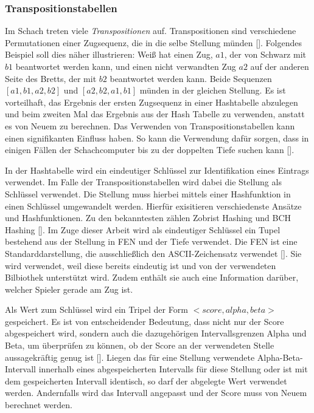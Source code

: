 \subsubsection{Transpositionstabellen} \label{ch:transposition-tables}

Im Schach treten viele \textit{Transpositionen} auf.
Transpositionen sind verschiedene Permutationen einer Zugsequenz, die in die selbe Stellung münden [\cite{Russell2010}].
Folgendes Beispiel soll dies näher illustrieren: Weiß hat einen Zug, $a1$, der von Schwarz mit $b1$ beantwortet werden kann, und einen nicht verwandten Zug $a2$ auf der anderen Seite des Bretts, der mit $b2$ beantwortet werden kann.
Beide Sequenzen $[a1, b1, a2, b2]$ und $[a2, b2, a1, b1]$ münden in der gleichen Stellung.
Es ist vorteilhaft, das Ergebnis der ersten Zugsequenz in einer Hashtabelle abzulegen und beim zweiten Mal das Ergebnis aus der Hash Tabelle zu verwenden, anstatt es von Neuem zu berechnen.
Das Verwenden von Transpositionstabellen kann einen signifikanten Einfluss haben.
So kann die Verwendung dafür sorgen, dass in einigen Fällen der Schachcomputer bis zu der doppelten Tiefe suchen kann [\cite{Russell2010}].

In der Hashtabelle wird ein eindeutiger Schlüssel zur Identifikation eines Eintrags verwendet.
Im Falle der Transpositionstabellen wird dabei die Stellung als Schlüssel verwendet.
Die Stellung muss hierbei mittels einer Hashfunktion in einen Schlüssel umgewandelt werden.
Hierfür exisitieren verschiedenste Ansätze und Hashfunktionen.
Zu den bekanntesten zählen Zobrist Hashing und BCH Hashing [\cite{Wiki2020}].
Im Zuge dieser Arbeit wird als eindeutiger Schlüssel ein Tupel bestehend aus der Stellung in \ac{FEN} und der Tiefe verwendet.
Die \ac{FEN} ist eine Standarddarstellung, die ausschließlich den ASCII-Zeichensatz verwendet [\cite{Edwards}].
Sie wird verwendet, weil diese bereits eindeutig ist und von der verwendeten Bilbiothek unterstützt wird.
Zudem enthält sie auch eine Information darüber, welcher Spieler gerade am Zug ist.

Als Wert zum Schlüssel wird ein Tripel der Form $<score, alpha, beta>$ gespeichert.
Es ist von entscheidender Bedeutung, dass nicht nur der Score abgespeichert wird, sondern auch die dazugehörigen Intervallsgrenzen Alpha und Beta, um überprüfen zu können, ob der Score an der verwendeten Stelle aussagekräftig genug ist [\cite{Wiki2020}].
Liegen das für eine Stellung verwendete Alpha-Beta-Intervall innerhalb eines abgespeicherten Intervalls für diese Stellung oder ist mit dem gespeicherten Intervall identisch, so darf der abgelegte Wert verwendet werden.
Andernfalls wird das Intervall angepasst und der Score muss von Neuem berechnet werden.

